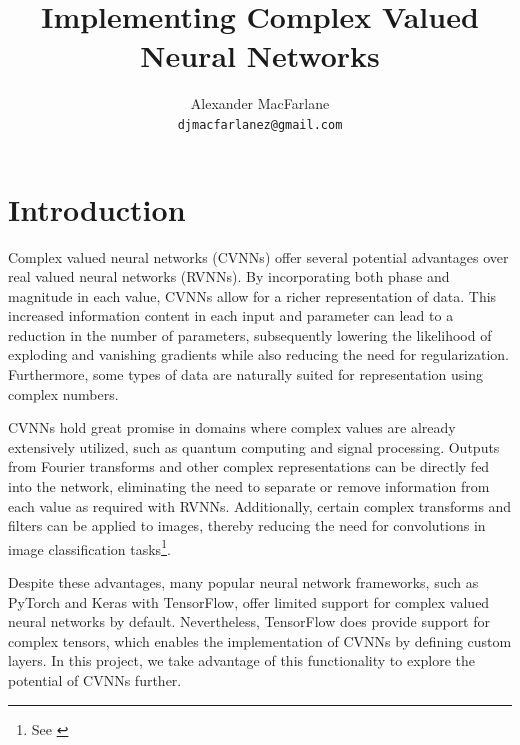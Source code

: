 \documentclass{article}
\title{Implementing Complex Valued Neural Networks}
\author{%
  Alexander MacFarlane\\
  \texttt{djmacfarlanez@gmail.com}
}
\begin{document}
\maketitle


\begin{abstract}
\end{abstract}
\section{Introduction}
Complex valued neural networks (CVNNs) offer several potential advantages over real valued neural networks (RVNNs). By incorporating both phase and magnitude in each value, CVNNs allow for a richer representation of data. This increased information content in each input and parameter can lead to a reduction in the number of parameters, subsequently lowering the likelihood of exploding and vanishing gradients while also reducing the need for regularization. Furthermore, some types of data are naturally suited for representation using complex numbers.

CVNNs hold great promise in domains where complex values are already extensively utilized, such as quantum computing and signal processing. Outputs from Fourier transforms and other complex representations can be directly fed into the network, eliminating the need to separate or remove information from each value as required with RVNNs. Additionally, certain complex transforms and filters can be applied to images, thereby reducing the need for convolutions in image classification tasks\footnote{See \cite{ko2022coshnet}}.

Despite these advantages, many popular neural network frameworks, such as PyTorch and Keras with TensorFlow, offer limited support for complex valued neural networks by default. Nevertheless, TensorFlow does provide support for complex tensors, which enables the implementation of CVNNs by defining custom layers. In this project, we take advantage of this functionality to explore the potential of CVNNs further.
\end{document}
